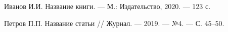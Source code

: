 \begin{thebibliography}{9}

     Иванов И.И. Название книги. — М.: Издательство, 2020. — 123 с.
    
     Петров П.П. Название статьи // Журнал. — 2019. — №4. — С. 45–50.
    
    \end{thebibliography}